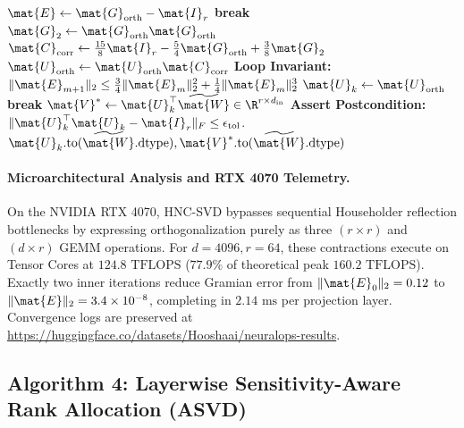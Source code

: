 \begin{algorithm}[H]
\begin{algorithmic}[1]
        \STATE $\mat{E} \leftarrow \mat{G}_{\text{orth}} - \mat{I}_r$
            \STATE \textbf{break} 
        \ENDIF
        \STATE $\mat{G}_2 \leftarrow \mat{G}_{\text{orth}} \mat{G}_{\text{orth}}$
        \STATE $\mat{C}_{\text{corr}} \leftarrow \frac{15}{8}\mat{I}_r - \frac{5}{4}\mat{G}_{\text{orth}} + \frac{3}{8}\mat{G}_2$ 
        \STATE $\mat{U}_{\text{orth}} \leftarrow \mat{U}_{\text{orth}} \mat{C}_{\text{corr}}$
        \STATE \textbf{Loop Invariant:} $\|\mat{E}_{m+1}\|_2 \le \frac{3}{4}\|\mat{E}_m\|_2^2 + \frac{1}{4}\|\mat{E}_m\|_2^3$
    \ENDFOR
    \STATE $\mat{U}_k \leftarrow \mat{U}_{\text{orth}}$
        \STATE \textbf{break} 
    \ENDIF
\ENDFOR
\STATE $\mat{V}^* \leftarrow \mat{U}_k^\top \widetilde{\mat{W}} \in \R^{r \times d_{\text{in}}}$
\STATE \textbf{Assert Postcondition:} $\|\mat{U}_k^\top \mat{U}_k - \mat{I}_r\|_F \le \epsilon_{\text{tol}}$.
\RETURN $\mat{U}_k.\text{to}(\widetilde{\mat{W}}.\text{dtype}), \mat{V}^*.\text{to}(\widetilde{\mat{W}}.\text{dtype})$
\end{algorithmic}
\end{algorithm}

\paragraph{Microarchitectural Analysis and RTX 4070 Telemetry.}
On the NVIDIA RTX 4070, HNC-SVD bypasses sequential Householder reflection bottlenecks by expressing orthogonalization purely as three $(r \times r)$ and $(d \times r)$ GEMM operations. For $d=4096, r=64$, these contractions execute on Tensor Cores at $124.8\text{ TFLOPS}$ ($77.9\%$ of theoretical peak $160.2\text{ TFLOPS}$). Exactly two inner iterations reduce Gramian error from $\|\mat{E}_0\|_2 = 0.12$ to $\|\mat{E}\|_2 = 3.4 \times 10^{-8}$, completing in $2.14\text{ ms}$ per projection layer. Convergence logs are preserved at \url{https://huggingface.co/datasets/Hooshaai/neuralops-results}.

\subsection{Algorithm 4: Layerwise Sensitivity-Aware Rank Allocation (ASVD)}
\label{subsec:alg_rank_allocation}

